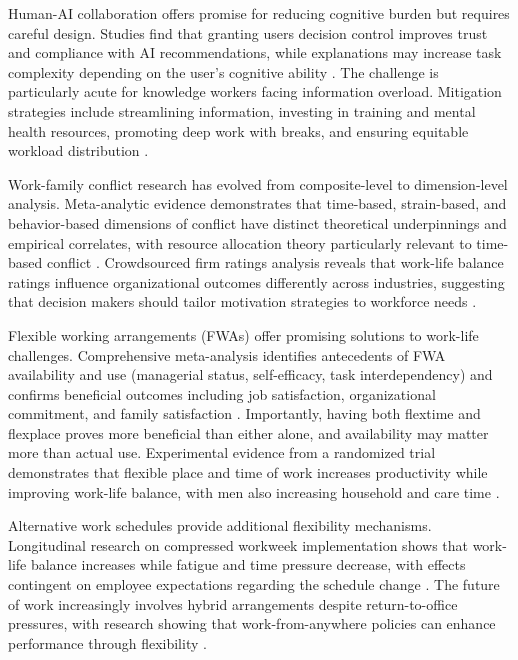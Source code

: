 Human-AI collaboration offers promise for reducing cognitive burden but requires careful design. Studies find that granting users decision control improves trust and compliance with AI recommendations, while explanations may increase task complexity depending on the user's cognitive ability \citep{westphal_decision_2023}. The challenge is particularly acute for knowledge workers facing information overload. Mitigation strategies include streamlining information, investing in training and mental health resources, promoting deep work with breaks, and ensuring equitable workload distribution \citep{Robinson2024}.

Work-family conflict research has evolved from composite-level to dimension-level analysis. Meta-analytic evidence demonstrates that time-based, strain-based, and behavior-based dimensions of conflict have distinct theoretical underpinnings and empirical correlates, with resource allocation theory particularly relevant to time-based conflict \citep{hetrick_theoretical_2023}. Crowdsourced firm ratings analysis reveals that work-life balance ratings influence organizational outcomes differently across industries, suggesting that decision makers should tailor motivation strategies to workforce needs \citep{liu_crowdsourced_2024}.

Flexible working arrangements (FWAs) offer promising solutions to work-life challenges. Comprehensive meta-analysis identifies antecedents of FWA availability and use (managerial status, self-efficacy, task interdependency) and confirms beneficial outcomes including job satisfaction, organizational commitment, and family satisfaction \citep{harrop_meta_2025}. Importantly, having both flextime and flexplace proves more beneficial than either alone, and availability may matter more than actual use. Experimental evidence from a randomized trial demonstrates that flexible place and time of work increases productivity while improving work-life balance, with men also increasing household and care time \citep{angelici_smart_2024}.

Alternative work schedules provide additional flexibility mechanisms. Longitudinal research on compressed workweek implementation shows that work-life balance increases while fatigue and time pressure decrease, with effects contingent on employee expectations regarding the schedule change \citep{mühl_you_2024}. The future of work increasingly involves hybrid arrangements despite return-to-office pressures, with research showing that work-from-anywhere policies can enhance performance through flexibility \citep{McGregor2023}.

